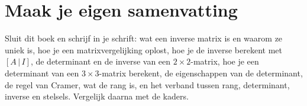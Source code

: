 \begin{oefeningen}







\end{oefeningen}


\ifzelfstudie
\section*{Maak je eigen samenvatting}
Sluit dit boek en schrijf in je schrift: wat een inverse matrix is en waarom ze uniek is, hoe je een matrixvergelijking oplost, hoe je de inverse berekent met $[A \,|\, I]$, de determinant en de inverse van een $2 \times 2$-matrix, hoe je een determinant van een $3 \times 3$-matrix berekent, de eigenschappen van de determinant, de regel van Cramer, wat de rang is, en het verband tussen rang, determinant, inverse en stelsels. Vergelijk daarna met de kaders.
\fi
